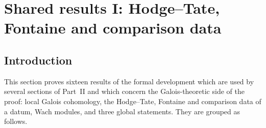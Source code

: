 \section{Shared results I: Hodge--Tate, Fontaine and comparison data}\label{sec:pf:sh-hodge}

\providecommand{\shhodgeinv}{\operatorname{inv}}
\providecommand{\shhodgeHf}{H^1_{f}}
\providecommand{\shhodgeZf}{Z^1_{f}}
\providecommand{\shhodgeHfD}{H^1_{f,\mathrm{div}}}
\providecommand{\shhodgecl}{\operatorname{cl}}
\providecommand{\shhodgelen}{\operatorname{len}}
\providecommand{\shhodgeDec}{D}
\providecommand{\shhodgeIne}{I}
\providecommand{\shhodgeNm}{\mathrm{N}}
\providecommand{\shhodgeTr}{\operatorname{Tr}}
\providecommand{\shhodgeres}{\operatorname{res}}
\providecommand{\shhodgeSel}{\operatorname{Sel}}
\providecommand{\shhodgeBK}{\textup{(BK)}}
\providecommand{\shhodgeLTD}{\textup{(LTD)}}
\providecommand{\shhodgeLEC}{\textup{(LEC)}}
\providecommand{\shhodgeGAR}{\textup{(GAR)}}

\subsection{Introduction}\label{pf:sh-hodge:intro}

This section proves sixteen results of the formal development \cite{LeanSource2026} which are used by several
sections of Part~II and which concern the Galois-theoretic side of the proof: local Galois cohomology, the
Hodge--Tate, Fontaine and comparison data of a datum, Wach modules, and three global statements. They are grouped as
follows.

